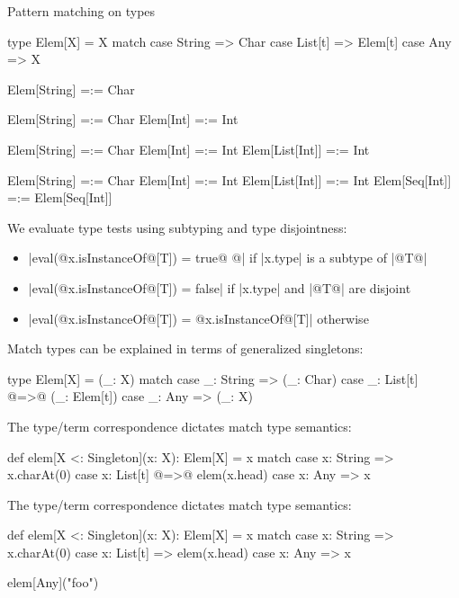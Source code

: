 \documentclass[10pt]{beamer}
\newenvironment{slide}[2][]
  {\begin{frame}[fragile,environment=slide,#1]{#2}}
  {\end{frame}}
\newcommand{\tp}[1]{\color{typeColor}#1}
\begin{document}
\begin{slide}{Pattern matching on types}
\begin{code}
type Elem[X] = X match
  case String => Char
  case List[t] => Elem[t]
  case Any => X
\end{code}

\medskip

\begin{overprint}
\begin{code}
Elem[String] =:= Char
\end{code}

\begin{code}
Elem[String] =:= Char
Elem[Int] =:= Int
\end{code}

\begin{code}
Elem[String] =:= Char
Elem[Int] =:= Int
Elem[List[Int]] =:= Int
\end{code}

\begin{code}
Elem[String] =:= Char
Elem[Int] =:= Int
Elem[List[Int]] =:= Int
Elem[Seq[Int]] =:= Elem[Seq[Int]]
\end{code}

We evaluate type tests using subtyping and type disjointness:
\begin{itemize}
  \item |eval(@\tp{x.isInstanceOf}@[T]) = true@ @| \quad if |x.type| is a subtype of |@\tp{T}@|
  \item |eval(@\tp{x.isInstanceOf}@[T]) = false| \quad if |x.type| and |@\tp{T}@| are disjoint
  \item |eval(@\tp{x.isInstanceOf}@[T]) = @\tp{x.isInstanceOf}@[T]| \quad otherwise
\end{itemize}

Match types can be explained in terms of generalized singletons:

\medskip
\begin{code}
type Elem[X] = { (_: X) match
  case _: String => (_: Char)
  case _: List[t] @=>@ (_: Elem[t])
  case _: Any => (_: X)
}
\end{code}

The type/term correspondence dictates match type semantics:

\medskip
\begin{code}
def elem[X <: Singleton](x: X): Elem[X] = x match
  case x: String => x.charAt(0)
  case x: List[t] @=>@ elem(x.head)
  case x: Any => x
\end{code}

The type/term correspondence dictates match type semantics:

\medskip
\begin{code}
def elem[X <: Singleton](x: X): Elem[X] = x match
  case x: String => x.charAt(0)
  case x: List[t] => elem(x.head)
  case x: Any => x

elem[Any]("foo")
\end{code}
\vspace{-20pt}
\end{overprint}
\end{slide}
\end{document}
